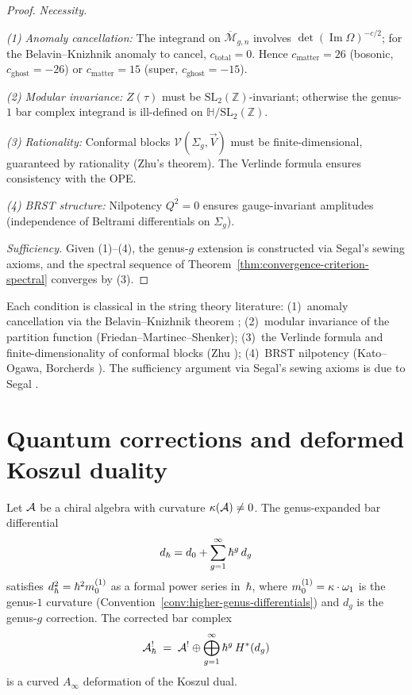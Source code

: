 \begin{proof}
\emph{Necessity.}

\emph{(1) Anomaly cancellation:} The integrand on $\overline{\mathcal{M}}_{g,n}$ involves $\det(\operatorname{Im} \Omega)^{-c/2}$; for the Belavin--Knizhnik anomaly to cancel, $c_{\mathrm{total}} = 0$.  Hence $c_{\mathrm{matter}} = 26$ (bosonic, $c_{\mathrm{ghost}} = -26$) or $c_{\mathrm{matter}} = 15$ (super, $c_{\mathrm{ghost}} = -15$).

\emph{(2) Modular invariance:} $Z(\tau)$ must be $\mathrm{SL}_2(\mathbb{Z})$-invariant; otherwise the genus-$1$ bar complex integrand is ill-defined on $\mathbb{H}/\mathrm{SL}_2(\mathbb{Z})$.

\emph{(3) Rationality:} Conformal blocks $\mathcal{V}(\Sigma_g, \vec{V})$ must be finite-dimensional, guaranteed by rationality (Zhu's theorem).  The Verlinde formula ensures consistency with the OPE.

\emph{(4) BRST structure:} Nilpotency $Q^2 = 0$ ensures gauge-invariant amplitudes (independence of Beltrami differentials on $\Sigma_g$).

\emph{Sufficiency.}
Given (1)--(4), the genus-$g$ extension is constructed via Segal's sewing axioms, and the spectral sequence of Theorem~\ref{thm:convergence-criterion-spectral} converges by (3).
\end{proof}

\begin{remark}[Provenance]
Each condition is classical in the string theory literature:
(1)~anomaly cancellation via the Belavin--Knizhnik theorem \cite{BK86};
(2)~modular invariance of the partition function (Friedan--Martinec--Shenker);
(3)~the Verlinde formula and finite-dimensionality of conformal blocks (Zhu \cite{Zhu96});
(4)~BRST nilpotency (Kato--Ogawa, Borcherds \cite{Bor92}).
The sufficiency argument via Segal's sewing axioms is due to Segal \cite{Seg04}.
\end{remark}

\section{Quantum corrections and deformed Koszul duality}

\begin{theorem}
\label{thm:genus-deformation-exact}
Let $\mathcal{A}$ be a chiral algebra with curvature
$\kappa(\mathcal{A}) \neq 0$.  The genus-expanded bar
differential
\[
d_{\hbar} = d_0 + \sum_{g=1}^\infty \hbar^g\, d_g
\]
satisfies $d_\hbar^2 = \hbar^2 m_0^{(1)}$ as a formal power
series in~$\hbar$, where $m_0^{(1)} = \kappa \cdot
\omega_1$ is the genus-$1$ curvature
(Convention~\textup{\ref{conv:higher-genus-differentials}})
and $d_g$ is the genus-$g$ correction.  The corrected bar complex
\[
\mathcal{A}^!_\hbar \;=\; \mathcal{A}^! \oplus
\bigoplus_{g=1}^\infty \hbar^g \, H^*(d_g)
\]
is a curved $A_\infty$ deformation of the Koszul dual.
\end{theorem}

